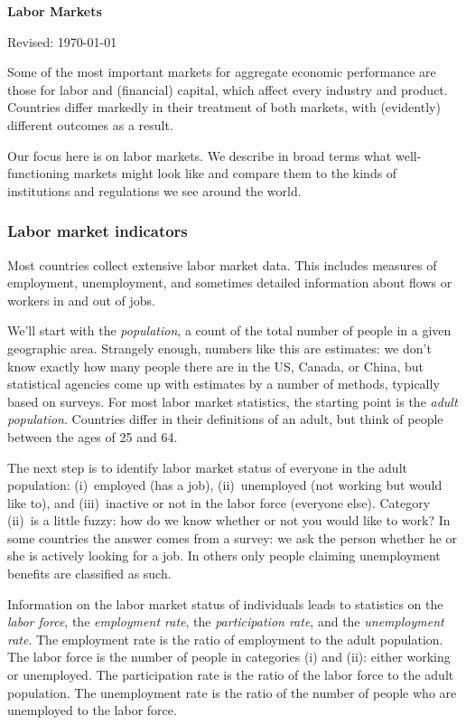 \documentclass[letterpaper,12pt]{article}
\def\HeadName{Labor Markets}
\begin{document}
\thispagestyle{empty}%
\Head

\centerline{\large \bf \HeadName}%
\centerline{Revised: \today}

\bigskip
Some of the most important markets for aggregate economic performance
are those for labor and (financial) capital,
which affect every industry and product.
Countries differ markedly in their treatment of both markets,
with (evidently) different outcomes as a result.

Our focus here is on labor markets.
We describe in broad terms what well-functioning markets might look like
and compare them to the kinds of institutions and regulations we see around the world.


\subsubsection*{Labor market indicators}

Most countries collect extensive labor market data.
This includes measures of employment, unemployment,
and sometimes detailed information about flows or workers
in and out of jobs.

We'll start with the {\it population\/},
a count of the total number of people in a given geographic area.
Strangely enough, numbers like this are estimates:
we don't know exactly how many people there are in
the US, Canada, or China, but statistical agencies come up
with estimates by a number of methods, typically based on surveys.
For most labor market statistics,
the starting point is the
{\it adult population\/}.
Countries differ in their definitions of an adult,
but think of people between the ages of 25 and 64.

The next step is to identify labor market status of everyone
in the adult population:
(i)~employed (has a job), (ii)~unemployed (not working but would like to),
and (iii)~inactive or not in the labor force (everyone else).
Category (ii)~is a little fuzzy:  how do we know whether or not
you would like to work? In some countries the answer comes from a
survey: we ask the person whether he or she is actively looking
for a job. In others only people claiming unemployment benefits
are classified as such.

Information on the labor market status of individuals leads to
statistics on the {\it labor force\/},
the {\it employment rate\/},
the {\it participation rate\/},
and the {\it unemployment rate\/}.
The employment rate is the ratio of employment to the adult population.
The labor force is the number of people in categories (i) and
(ii): either working or unemployed.
The participation rate is the ratio of the labor force to the adult population.
The unemployment rate is the ratio of the number of people who are unemployed to the labor force.
\end{document}
